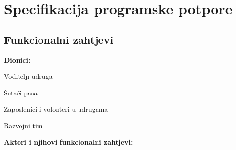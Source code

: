 \chapter{Specifikacija programske potpore}
	
\section{Funkcionalni zahtjevi}
		

		
		\noindent \textbf{Dionici:}
		
		\begin{packed_enum}
			
			\item Voditelji udruga
			\item Šetači pasa			
			\item Zaposlenici i volonteri u udrugama
			\item Razvojni tim
			
		\end{packed_enum}
		\vspace{5mm}
		
		\noindent \textbf{Aktori i njihovi funkcionalni zahtjevi:}
		
